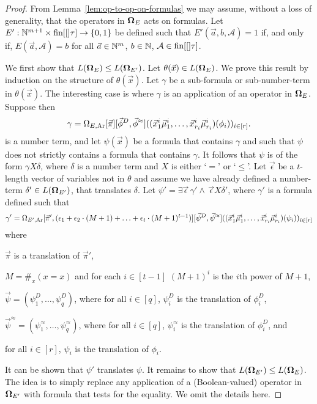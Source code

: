 \documentclass[../main/thesis.tex]{subfiles}
\begin{document}
\begin{proof}
  From Lemma~\ref{lem:op-to-op-on-formulas} we may assume, without a loss of
  generality, that the operators in $\mathbf{\mathbf{\Omega}}_E$ acts on formulas. Let $E' :
  \mathbb{N}^{m + 1} \times \text{\upshape fin}{[[]}\tau] \rightarrow \{0,1\}$ be defined such that $E'(\vec{a},
  b, \mathcal{A}) = 1$ if, and only if, $E(\vec{a}, \mathcal{A}) = b$ for all
  $\vec{a} \in \mathbb{N}^m$, $b \in \mathbb{N}$, $\mathcal{A} \in \text{\upshape fin}{[[]}\tau]$.

  We first show that $L(\mathbf{\mathbf{\Omega}}_E) \leq L(\mathbf{\mathbf{\Omega}}_{E'})$. Let $\theta(\vec{x}) \in
  L(\mathbf{\mathbf{\Omega}}_E)$. We prove this result by induction on the structure of
  $\theta(\vec{x})$. Let $\gamma$ be a sub-formula or sub-number-term in
  $\theta(\vec{x})$. The interesting case is where $\gamma$ is an application of
  an operator in $\mathbf{\mathbf{\Omega}}_E$. Suppose then
  \begin{align*}
    \gamma = \Omega_{E, \text{\upshape Ar}}[\vec{\pi}][\vec{\phi}^D, \vec{\phi}^{\approx}] ((\vec{x}^i_1 \vec{\mu}^i_1, \ldots, \vec{x}^i_{r_i} \vec{\mu}^i_{r_i})(\phi_i))_{i \in [r]}.
  \end{align*}
  is a number term, and let $\psi(\vec{x})$ be a formula that contains $\gamma$
  and such that $\psi$ does not strictly contains a formula that contains
  $\gamma$. It follows that $\psi$ is of the form $\gamma X \delta$, where
  $\delta$ is a number term and $X$ is either `$=$' or `$\leq$'. Let
  $\vec{\epsilon}$ be a $t$-length vector of variables not in $\theta$ and
  assume we have already defined a number-term $\delta' \in L(\mathbf{\mathbf{\Omega}}_{E'})$,
  that translates $\delta$. Let $\psi' = \exists \vec{\epsilon} \, \gamma' \land
  \, \vec{\epsilon} X \delta'$, where $\gamma'$ is a formula defined such that
  \begin{align*}
    \gamma' = \Omega_{E', \text{\upshape Ar}}[\vec{\pi}', (\epsilon_1 + \epsilon_2 \cdot (M+1) + \ldots + \epsilon_t \cdot (M+1)^{t-1})][\vec{\psi}^D, \vec{\psi}^{\approx}] ((\vec{x}^i_1 \vec{\mu}^i_1, \ldots, \vec{x}^i_{r_i} \vec{\mu}^i_{r_i})(\psi_i))_{i \in [r]}
  \end{align*}
  where
  \begin{myitemize}
  \item $\vec{\pi}$ is a translation of $\vec{\pi}'$,
  \item $M = \#_x (x = x)$ and for each $i \in [t - 1]$ $(M+1)^{i}$ is the $i$th
    power of $M+1$,
  \item $\vec{\psi} = (\psi^D_1, \ldots, \psi^D_{q})$, where for all $i \in
    [q]$, $\psi^D_i$ is the translation of $\phi^D_i$,
  \item $\vec{\psi}^{\approx} = (\psi^{\approx}_1, \ldots, \psi^{\approx}_q)$,
    where for all $i \in [q]$, $\psi^{\approx}_i$ is the translation of
    $\phi^D_i$, and
  \item for all $i \in [r]$, $\psi_i$ is the translation of $\phi_i$.
  \end{myitemize}
  It can be shown that $\psi'$ translates $\psi$. It remains to show that
  $L(\mathbf{\mathbf{\Omega}}_{E'}) \leq L(\mathbf{\mathbf{\Omega}}_{E})$. The idea is to simply replace any
  application of a (Boolean-valued) operator in $\mathbf{\mathbf{\Omega}}_{E'}$ with formula that
  tests for the equality. We omit the details here.
\end{proof}
\end{document}
